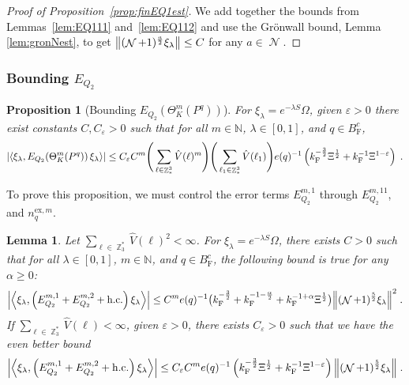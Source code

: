 \documentclass[12pt,a4paper]{article}
\numberwithin{equation}{section}
\newcommand{\NNN}{\mathbb{N}}
\newcommand{\1}{\mathbb{I}}
\newcommand{\ex}{\mathrm{ex}}
\newcommand{\F}{\mathrm{F}}
\DeclareMathOperator{\Z}{\mathbb{Z}}
\DeclareMathOperator{\NN}{\mathcal{N}}
\newcommand{\half}{\frac{1}{2}}
\newcommand{\eva}[1]{\left\langle #1 \right\rangle}
\theoremstyle{plain}
\newtheorem{lemma}[theorem]{Lemma}
\newtheorem{proposition}[theorem]{Proposition}
\theoremstyle{definition}
\theoremstyle{remark}
\theoremstyle{plain}
\theoremstyle{definition}
\theoremstyle{remark}
\begin{document}
\begin{proof}[Proof of Proposition~\ref{prop:finEQ1est}]
We add together the bounds from Lemmas~\ref{lem:EQ111} and~\ref{lem:EQ112} and use the Gr\"onwall bound, Lemma \ref{lem:gronNest}, to get $ \norm{(\NN+1)^{\frac{a}{2}} \xi_\lambda} \le C $ for any $ a \in \NN $.
\end{proof}






\subsubsection{Bounding $E_{Q_2}$}


\begin{proposition}[Bounding $E_{Q_2}(\Theta^m_{K}(P^q))$]\label{prop:finEQ2est}
For $\xi_\lambda = e^{-\lambda S} \Omega$, given $ \varepsilon > 0 $ there exist constants $ C, C_\varepsilon > 0 $ such that for all $ m \in \NNN $, $ \lambda \in [0,1] $, and $ q \in B_{\F}^c $,
\begin{equation}\label{eq:finEQ2est}
	\abs{\eva{\xi_\lambda, E_{Q_2}\!\left(\Theta^m_K(P^q)\right) \xi_\lambda}} 
	\leq C_\varepsilon C^m \Bigg(\sum\limits_{\ell \in \Z^3_*} \hat{V}(\ell)^m\Bigg)
		\Bigg( \sum\limits_{\ell_1 \in \Z^3_*} \hat{V}(\ell_1) \Bigg)
		e(q)^{-1} \left( k_{\F}^{-\frac{3}{2}} \Xi^\half
		+ k_{\F}^{-1} \Xi^{1-\varepsilon} \right) \;. \\
\end{equation}
\end{proposition}

To prove this proposition, we must control the error terms $ E^{m,1}_{Q_2} $ through $ E^{m,11}_{Q_2} $, and $ n_q^{\ex,m} $.


\begin{lemma} \label{lem:EQ211}
Let $ \sum_{\ell \in \Z_3^*} \hat{V}(\ell)^2 < \infty $. For $\xi_\lambda = e^{-\lambda S} \Omega$, there exists $ C > 0 $ such that for all $ \lambda \in [0,1] $, $ m \in \NNN $, and $ q \in B_{\F}^c $, the following bound is true for any $ \alpha \ge 0 $:
\begin{align}
	\abs{\eva{\xi_\lambda,\left(E^{m,1}_{Q_2}+E^{m,2}_{Q_2}+\mathrm{h.c.}\right) \xi_\lambda }}
	\leq C^m
		e(q)^{-1}
		\big( k_{\F}^{-\frac 32}
		+ k_{\F}^{-1-\frac{\alpha}{2}} 
		+ k_{\F}^{-1+\alpha} \Xi^{\half} \big)
		\norm { (\NN+1)^{\frac 52} \xi_\lambda }^2 \;. \label{eq:estEQ211_Coulomb}
\end{align}
If $ \sum_{\ell \in \Z_3^*} \hat{V}(\ell) < \infty $, given $ \varepsilon > 0 $, there exists $ C_\varepsilon > 0 $ such that we have the even better bound
\begin{align}
	\abs{\eva{\xi_\lambda,\left(E^{m,1}_{Q_2}+E^{m,2}_{Q_2}+\mathrm{h.c.}\right) \xi_\lambda }}
	\leq C_\varepsilon C^m e(q)^{-1} \left( k_{\F}^{-\frac{3}{2}} \Xi^\half 
		+ k_{\F}^{-1}\Xi^{1-\varepsilon} \right)
		\norm { (\NN+1)^{\frac 52} \xi_\lambda } \;. \label{eq:estEQ211}
\end{align}
\end{lemma}
\end{document}
